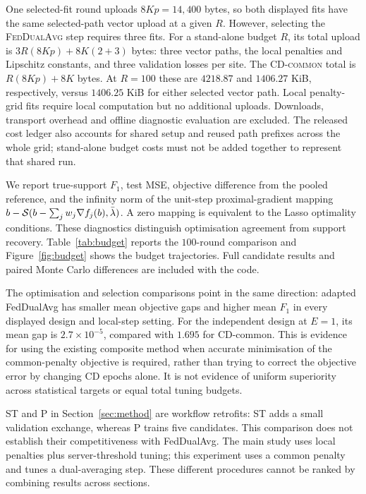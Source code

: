 One selected-fit round uploads $8Kp=14{,}400$ bytes, so both displayed fits
have the same selected-path vector upload at a given $R$. However, selecting
the \textsc{FedDualAvg} step requires three fits. For a stand-alone budget
$R$, its total upload is $3R(8Kp)+8K(2+3)$ bytes: three vector paths,
the local penalties and Lipschitz constants, and three validation losses
per site. The \textsc{CD-common} total is $R(8Kp)+8K$ bytes. At $R=100$
these are $4218.87$ and $1406.27$ KiB, respectively, versus $1406.25$ KiB
for either selected vector path. Local penalty-grid fits require local
computation but no additional uploads. Downloads, transport overhead and
offline diagnostic evaluation are excluded. The released cost ledger also
accounts for shared setup and reused path prefixes across the whole grid;
stand-alone budget costs must not be added together to represent that
shared run.

We report true-support $F_1$, test MSE, objective difference from the
pooled reference, and the infinity norm of the unit-step proximal-gradient
mapping
$b-\mathcal{S}(b-\sum_jw_j\nabla f_j(b),\bar\lambda)$.
A zero mapping is equivalent to the Lasso optimality conditions. These
diagnostics distinguish optimisation agreement from support recovery.
Table~\ref{tab:budget} reports the $100$-round comparison and
Figure~\ref{fig:budget} shows the budget trajectories. Full candidate
results and paired Monte Carlo differences are included with the code.



The optimisation and selection comparisons point in the same direction:
adapted FedDualAvg has smaller mean objective gaps and higher mean $F_1$
in every displayed design and local-step setting. For the independent
design at $E=1$, its mean gap is $2.7\times10^{-5}$, compared with
$1.695$ for CD-common. This is evidence for using the existing composite
method when accurate minimisation of the common-penalty objective is
required, rather than trying to correct the objective error by changing
CD epochs alone. It is not evidence of uniform superiority across
statistical targets or equal total tuning budgets.

ST and P in Section~\ref{sec:method} are workflow retrofits: ST adds a
small validation exchange, whereas P trains five candidates. This
comparison does not establish their competitiveness with FedDualAvg.
The main study uses local penalties plus server-threshold tuning; this
experiment uses a common penalty and tunes a dual-averaging step.
These different procedures cannot be ranked by combining results across
sections.

